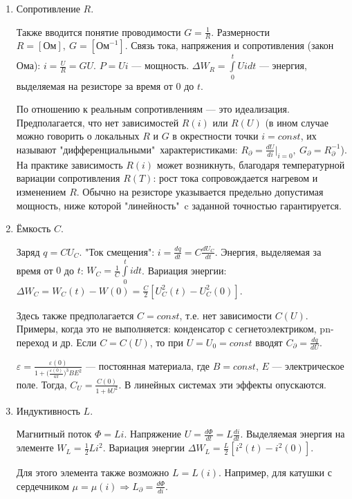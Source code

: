 \documentclass[../main/main.tex]{subfiles}
\begin{document}
\begin{enumerate}
    \item Сопротивление $R$. %
    
    Также вводится понятие проводимости $G = \frac{1}{R}$. Размерности $R = [\text{Ом}],~G = [\text{Ом}^{-1}]$. Связь тока, напряжения и сопротивления (закон Ома): $i=\frac{U}{R}=GU$. $P=Ui$ --- мощность. $\Delta W_R = \int\limits_{0}^{t} Ui dt$ --- энергия, выделяемая на резисторе за время от $0$ до $t$.
    
    По отношению к реальным сопротивлениям --- это идеализация. Предполагается, что нет зависимостей $R(i)$ или $R(U)$ (в ином случае можно говорить о локальных $R$ и $G$ в окрестности точки $i = const$, их называют "дифференциальными"\ характеристиками: $R_\partial = \frac{dU}{di}\bigg|_{i=0},~G_\partial = R_\partial^{-1}$). На практике зависимость $R(i)$ может возникнуть, благодаря температурной вариации сопротивления $R(T)$: рост тока сопровождается нагревом и изменением $R$. Обычно на резисторе указывается предельно допустимая мощность, ниже которой "линейность"\ c заданной точностью гарантируется.
    
    \item Ёмкость $C$. 
    
    Заряд $q = CU_C$. "Ток смещения": $i = \frac{dq}{dt} = C \frac{dU_C}{dt}$. Энергия, выделяемая за время от $0$ до $t$: $W_C = \frac{1}{C} \int\limits_{0}^{t} i dt$. Вариация энергии: $\Delta W_C = W_C(t) - W(0) = \frac{C}{2} [U_C^2(t) - U_C^2(0)]$.
    
    Здесь также предполагается $C = const$, т.е. нет зависимости $C(U)$. Примеры, когда это не выполняется: конденсатор с сегнетоэлектриком, pn-переход и др. Если $C = C(U)$, то при $U = U_0 = const$ вводят $C_\partial = \frac{dq}{dU}$. 
    
    $\varepsilon = \frac{\varepsilon(0)}{1 + \bigg(\frac{\varepsilon(0)}{4\pi}\bigg)^3 BE^2}$ --- постоянная материала, где $B = const$, $E$ --- электрическое поле. Тогда, $C_U = \frac{C(0)}{1 + bU^2}$. В линейных системах эти эффекты опускаются. 
    
    \item Индуктивность $L$.
    
    Магнитный поток $\Phi = Li$. Напряжение $U = \frac{d\Phi}{dt} = L \frac{di}{dt}$. Выделяемая энергия на элементе $W_L = \frac{1}{2} Li^2$. Вариация энергии $\Delta W_L = \frac{L}{2} [i^2(t) - i^2(0)]$.
    
    Для этого элемента также возможно $L = L(i)$. Например, для катушки с сердечником $\mu = \mu(i) \Rightarrow L_\partial = \frac{d\Phi}{di}$.
\end{enumerate}
\end{document}
